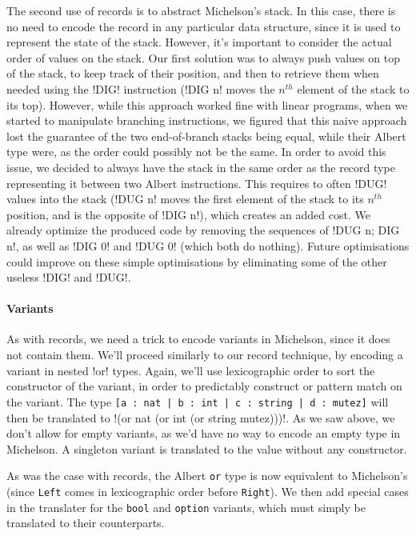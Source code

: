 \documentclass{report}
\begin{document}
The second use of records is to abstract Michelson's stack. In this case, there is no need to encode the record in any particular data structure, since it is used to represent the state of the stack. However, it's important to consider the actual order of values on the stack. Our first solution was to always push values on top of the stack, to keep track of their position, and then to retrieve them when needed using the !DIG! instruction (!DIG n! moves the $n^{th}$ element of the stack to its top). However, while this approach worked fine with linear programs, when we started to manipulate branching instructions, we figured that this naive approach lost the guarantee of the two end-of-branch stacks being equal, while their Albert type were, as the order could possibly not be the same. In order to avoid this issue, we decided to always have the stack in the same order as the record type representing it between two Albert instructions. This requires to often !DUG! values into the stack (!DUG n! moves the first element of the stack to its $n^{th}$ position, and is the opposite of !DIG n!), which creates an added cost. We already optimize the produced code by removing the sequences of !DUG n; DIG n!, as well as !DIG 0! and !DUG 0! (which both do nothing). Future optimisations could improve on these simple optimisations by eliminating some of the other useless !DIG! and !DUG!.

\paragraph{Variants}

As with records, we need a trick to encode variants in Michelson, since it does not contain them. We'll proceed similarly to our record technique, by encoding a variant in nested !or! types. Again, we'll use lexicographic order to sort the constructor of the variant, in order to predictably construct or pattern match on the variant. The type \lstinline{[a : nat | b : int | c : string | d : mutez]} will then be translated to !(or nat (or int (or string mutez)))!. As we saw above, we don't allow for empty variants, as we'd have no way to encode an empty type in Michelson. A singleton variant is translated to the value without any constructor.

As was the case with records, the Albert \lstinline{or} type is now equivalent to Michelson's (since \lstinline{Left} comes in lexicographic order before \lstinline{Right}). We then add special cases in the translater for the \lstinline{bool} and \lstinline{option} variants, which must simply be translated to their counterparts.
\end{document}
